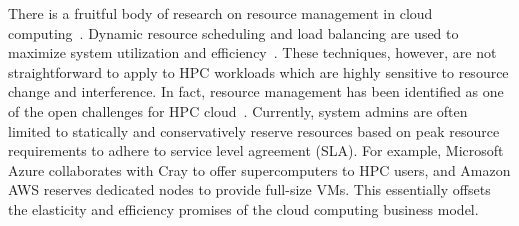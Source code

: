 There is a fruitful body of research on resource management in 
cloud computing~\cite{singh2016survey,zhan2015cloud,gill2018chopper}. Dynamic resource scheduling and 
load balancing are used 
to maximize system utilization and efficiency~\cite{adhikari2018heuristic,panwar2015load}. These techniques, however, 
are not straightforward to apply to HPC workloads which are highly sensitive to resource change and interference. 
In fact, resource management has been identified as one of the open 
challenges for HPC cloud~\cite{netto2018hpc}. 
Currently, system admins are often limited to statically and conservatively reserve 
resources based on peak resource requirements to adhere to service level agreement (SLA). For example, Microsoft Azure collaborates with Cray to offer supercomputers to HPC users, 
and Amazon AWS reserves dedicated nodes to provide full-size VMs. 
This essentially offsets 
the elasticity and efficiency promises of the cloud computing business model. 


